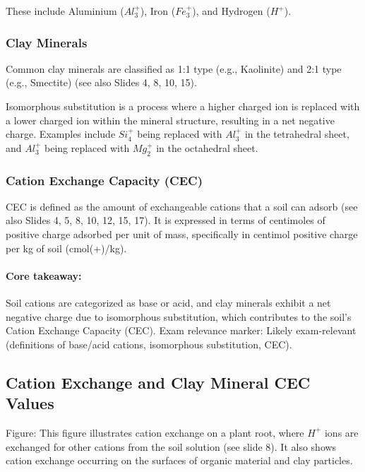 These include Aluminium ($Al_3^+$), Iron ($Fe_3^+$), and Hydrogen ($H^+$).

\subsubsection*{Clay Minerals} 
Common clay minerals are classified as 1:1 type (e.g., Kaolinite) and 2:1 type (e.g., Smectite) (see also Slides 4, 8, 10, 15).

Isomorphous substitution is a process where a higher charged ion is replaced with a lower charged ion within the mineral structure, resulting in a net negative charge. Examples include $Si_4^+$ being replaced with $Al_3^+$ in the tetrahedral sheet, and $Al_3^+$ being replaced with $Mg_2^+$ in the octahedral sheet.

\subsubsection*{Cation Exchange Capacity (CEC)} 
CEC is defined as the amount of exchangeable cations that a soil can adsorb (see also Slides 4, 5, 8, 10, 12, 15, 17). It is expressed in terms of centimoles of positive charge adsorbed per unit of mass, specifically in centimol positive charge per kg of soil (cmol(+)/kg).

\paragraph*{Core takeaway:} 
Soil cations are categorized as base or acid, and clay minerals exhibit a net negative charge due to isomorphous substitution, which contributes to the soil's Cation Exchange Capacity (CEC). Exam relevance marker: Likely exam-relevant (definitions of base/acid cations, isomorphous substitution, CEC).

\subsection{Cation Exchange and Clay Mineral CEC Values}
Figure: This figure illustrates cation exchange on a plant root, where $H^+$ ions are exchanged for other cations from the soil solution (see slide 8). It also shows cation exchange occurring on the surfaces of organic material and clay particles.

